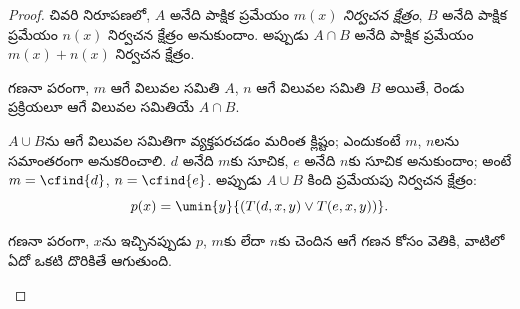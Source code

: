 \documentclass[../../../include/open-logic-section]{subfiles}
\begin{document}
\begin{proof}
చివరి నిరూపణలో, $A$ అనేది పాక్షిక ప్రమేయం $m(x)$
\emph{నిర్వచన క్షేత్రం}, $B$ అనేది పాక్షిక ప్రమేయం $n(x)$
నిర్వచన క్షేత్రం అనుకుందాం. అప్పుడు $A \cap B$ అనేది పాక్షిక
ప్రమేయం $m(x)+n(x)$ నిర్వచన క్షేత్రం.

\begin{explain}
గణనా పరంగా, $m$ ఆగే విలువల సమితి $A$, $n$ ఆగే విలువల సమితి $B$
అయితే, రెండు ప్రక్రియలూ ఆగే విలువల సమితియే $A \cap B$.
\end{explain}

$A \cup B$ను ఆగే విలువల సమితిగా వ్యక్తపరచడం మరింత క్లిష్టం;
ఎందుకంటే $m$, $n$లను సమాంతరంగా అనుకరించాలి. $d$ అనేది $m$కు
సూచిక, $e$ అనేది $n$కు సూచిక అనుకుందాం; అంటే $m=\cfind{d}$,
$n=\cfind{e}$. అప్పుడు $A \cup B$ కింది ప్రమేయపు నిర్వచన క్షేత్రం:
\[
p(x) = \umin{y}{(T(d,x,y) \lor T(e,x,y))}.
\]
\begin{explain}
గణనా పరంగా, $x$ను ఇచ్చినప్పుడు $p$, $m$కు లేదా $n$కు చెందిన ఆగే గణన
కోసం వెతికి, వాటిలో ఏదో ఒకటి దొరికితే ఆగుతుంది.
\end{explain}
\end{proof}
\end{document}
